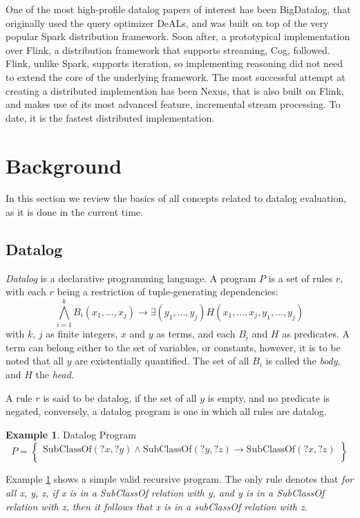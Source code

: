 \documentclass[sigconf,screen,review,natbib]{acmart}
\theoremstyle{definition}
\newtheorem{exmp}{Example}[section]
\begin{document}
One of the most high-profile datalog papers of interest has been BigDatalog\cite{bigdatalog}, that
originally used the query optimizer DeALs, and was built on top of the very popular Spark\cite{spark}
distribution framework. Soon after, a prototypical implementation\cite{cog} over Flink\cite{flink},
a distribution framework that supports streaming, Cog, followed. Flink, unlike Spark, supports
iteration, so implementing reasoning did not need to extend the core of the underlying framework. The most
successful attempt at creating a distributed implemention has been Nexus\cite{nexus}, that is also built on Flink,
and makes use of its most advanced feature, incremental stream processing. To date, it is the fastest distributed
implementation.

\section{Background}

In this section we review the basics of all concepts related to datalog evaluation, as it is done in the current time.

\subsection{Datalog}

\textit{Datalog}\cite{datalog} is a declarative programming language. A program $P$ is a set of
rules $r$, with each $r$ being a restriction of tuple-generating dependencies: \[\bigwedge_{i=1}^kB_i(x_1, ..., x_j) \rightarrow \exists (y_1, ..., y_j)H(x_1, ..., x_j, y_1, ..., y_j)\]
with $k$, $j$ as finite integers, $x$ and $y$ as terms, and each $B_i$ and $H$ as predicates. A term can belong
either to the set of variables, or constants, however, it is to be noted that all $y$ are existentially quantified.
The set of all $B_i$ is called the \textit{body}, and $H$ the \textit{head}.

A rule $r$ is said to be datalog, if the set of all $y$ is empty, and no predicate is negated, conversely, a
datalog program is one in which all rules are datalog.
\begin{exmp}{Datalog Program}\label{ex1}
	\[
		P = \left\{  \begin{array}{l}
			\text{SubClassOf}(?x, ?y) \wedge \text{SubClassOf}(?y, ?z) \rightarrow \text{SubClassOf}(?x, ?z) \\
		\end{array}\right\}
	\]
\end{exmp}
Example \ref{ex1} shows a simple valid recursive program. The only rule denotes that \textit{for all x, y, z, if x is
	in a SubClassOf relation with y, and y is in a SubClassOf relation with z, then it follows that x is in a subClassOf
	relation with z}.
\end{document}
